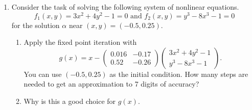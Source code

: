 \documentclass[a4paper,12pt]{article}
\newcommand{\pmat}[1]{\begin{pmatrix} #1 \end{pmatrix}}
\begin{document}
\begin{enumerate}[label = \arabic*)]
	\item Consider the task of solving the following system of nonlinear equations.
	\[
		f_1(x,y) = 3x^2 + 4y^2 - 1 = 0 \text{ and } f_2(x,y) = y^3 - 8x^3 - 1 = 0
	\]
	for the solution $ \alpha $ near $ (x,y) = (-0.5, 0.25) $.
	\begin{enumerate}[label = (\alph*)]
		\item Apply the fixed point iteration with
		\[
			g(x) = x - \pmat{0.016 & -0.17 \\ 0.52 & -0.26} \pmat{3x^2 + 4y^2 - 1 \\ y^3 - 8x^3 - 1}.
		\]
		You can use $ (-0.5, 0.25) $ as the initial condition. How many steps are needed to get an approximation to 7 digits of accuracy?
		
		\item Why is this a good choice for $ g(x) $.
	\end{enumerate}
\end{enumerate}
\end{document}
